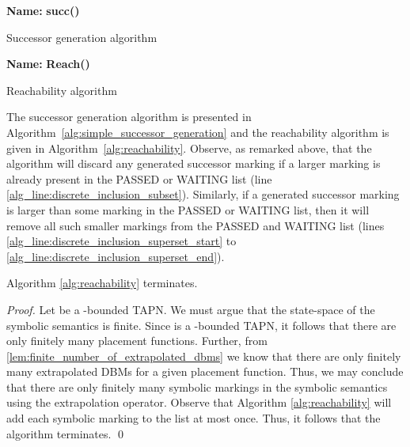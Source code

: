 \begin{algorithm}[p]
\textbf{Name: } \textbf{succ()}\;
\caption{Successor generation algorithm\label{alg:simple_successor_generation}}  
\end{algorithm}

\begin{algorithm}[p]
\textbf{Name:} \textbf{Reach()}\;
\caption{Reachability algorithm\label{alg:reachability}}  
\end{algorithm}
The successor generation algorithm is presented in 
Algorithm~\ref{alg:simple_successor_generation} and the reachability 
algorithm is given in Algorithm~\ref{alg:reachability}.
Observe, as remarked above, that the algorithm will discard any generated successor marking if a larger marking is already present in the PASSED or WAITING list (line \ref{alg_line:discrete_inclusion_subset}). Similarly, if a generated successor marking is larger than some marking in the PASSED or WAITING list, then it will remove all such smaller markings from the PASSED and WAITING list (lines \ref{alg_line:discrete_inclusion_superset_start} to \ref{alg_line:discrete_inclusion_superset_end}). 



\begin{lemma}\label{lem:algorithm_termination}
Algorithm \ref{alg:reachability} terminates.
\end{lemma}
\begin{proof}
Let  be a -bounded TAPN. We must argue that the state-space of the symbolic semantics is finite. Since  is a -bounded TAPN, it follows that there are only finitely many placement functions. Further, from \cref{lem:finite_number_of_extrapolated_dbms} we know that there are only finitely many extrapolated DBMs for a given placement function. Thus, we may conclude that there are only finitely many symbolic markings in the symbolic semantics using the extrapolation operator. Observe that Algorithm \ref{alg:reachability} will add each symbolic marking to the  list at most once. Thus, it follows that the algorithm terminates.
\qed
\end{proof}

